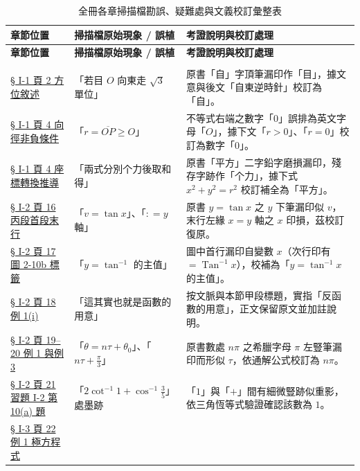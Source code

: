 \documentclass[a4paper,12pt,twoside]{article}
\begin{document}
\small
\renewcommand{\arraystretch}{1.35}
\begin{xltabular}{\textwidth}{|p{3.2cm}|p{3.8cm}|X|}
\caption{全冊各章掃描檔勘誤、疑難處與文義校訂彙整表}\label{tab:errata_b5s_master} \\
\hline
\textbf{章節位置} & \textbf{掃描檔原始現象 / 誤植} & \textbf{考證說明與校訂處理} \\ \hline
\endfirsthead
\hline
\textbf{章節位置} & \textbf{掃描檔原始現象 / 誤植} & \textbf{考證說明與校訂處理} \\ \hline
\endhead
\hline
\endfoot
{} \\ \hline
\hyperref[note:b5s-ch1-p2-zi]{§ I-1 頁 2 方位敘述} & 
「若目 $O$ 向東走 $\sqrt{3}$ 單位」 & 
原書「自」字頂筆漏印作「目」，據文意與後文「自東逆時針」校訂為「自」。 \\
\hline
\hyperref[note:b5s-ch1-p4-ge0]{§ I-1 頁 4 向徑非負條件} & 
「$r = \overline{OP} \ge O$」 & 
不等式右端之數字「$0$」誤排為英文字母「$O$」，據下文「$r > 0$」、「$r = 0$」校訂為數字「$0$」。 \\
\hline
\hyperref[note:b5s-ch1-p4-pingfang]{§ I-1 頁 4 座標轉換推導} & 
「兩式分別个力後取和得」 & 
原書「平方」二字鉛字磨損漏印，殘存字跡作「个力」，據下式 $x^2+y^2=r^2$ 校訂補全為「平方」。 \\
\hline
\hyperref[note:b5s-ch1-p16bottom]{§ I-2 頁 16 丙段首段末行} & 
「$v = \tan x$」、「$: = y$ 軸」 & 
原書 $y = \tan x$ 之 $y$ 下筆漏印似 $v$，末行左緣 $x = y$ 軸之 $x$ 印損，茲校訂復原。 \\
\hline
\hyperref[note:b5s-ch1-fig2-10b]{§ I-2 頁 17 圖 2-10b 標籤} & 
「$y = \tan^{-1}$ 的主值」 & 
圖中首行漏印自變數 $x$（次行印有 $= \operatorname{Tan}^{-1} x$），校補為「$y = \tan^{-1} x$ 的主值」。 \\
\hline
\hyperref[note:b5s-ch1-p18ex1]{§ I-2 頁 18 例 1(i)} & 
「這其實也就是函數的用意」 & 
按文脈與本節甲段標題，實指「反函數的用意」，正文保留原文並加註說明。 \\
\hline
\hyperref[note:b5s-ch1-p19pi]{§ I-2 頁 19--20 例 1 與例 3} & 
「$\theta = n\tau + \theta_0$」、「$n\tau + \frac{\pi}{3}$」 & 
原書數處 $n\pi$ 之希臘字母 $\pi$ 左豎筆漏印而形似 $\tau$，依通解公式校訂為 $n\pi$。 \\
\hline
\hyperref[note:b5s-ch1-p21ex10a]{§ I-2 頁 21 習題 I-2 第 10(a) 題} & 
「$2\cot^{-1} 1 + \cos^{-1}\frac{3}{5}$」處墨跡 & 
「$1$」與「$+$」間有細微豎跡似重影，依三角恆等式驗證確認該數為 $1$。 \\
\hline
\hyperref[note:b5s-ch1-p22-ex1]{§ I-3 頁 22 例 1 極方程式} & 

\end{xltabular}
\end{document}
